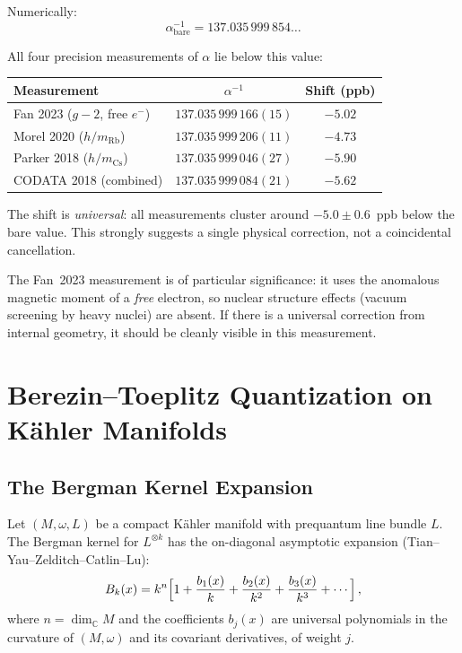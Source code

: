 \documentclass[12pt,a4paper]{article}
\theoremstyle{definition}
\theoremstyle{remark}
\newcommand{\inv}{^{-1}}
\begin{document}
Numerically:
\begin{equation}
\alpha\inv_{\mathrm{bare}} = 137.035\,999\,854\ldots
\end{equation}

\medskip

All four precision measurements of $\alpha$ lie below this value:

\begin{center}
\begin{tabular}{lcc}
\toprule
Measurement & $\alpha\inv$ & Shift (ppb) \\
\midrule
Fan 2023 ($g{-}2$, free $e^-$) & $137.035\,999\,166(15)$ & $-5.02$ \\
Morel 2020 ($h/m_{\mathrm{Rb}}$) & $137.035\,999\,206(11)$ & $-4.73$ \\
Parker 2018 ($h/m_{\mathrm{Cs}}$) & $137.035\,999\,046(27)$ & $-5.90$ \\
CODATA 2018 (combined) & $137.035\,999\,084(21)$ & $-5.62$ \\
\bottomrule
\end{tabular}
\end{center}

The shift is \emph{universal}: all measurements cluster around
$-5.0 \pm 0.6$~ppb below the bare value. This strongly suggests a single
physical correction, not a coincidental cancellation.

The Fan~2023 measurement is of particular significance: it uses the anomalous
magnetic moment of a \emph{free} electron, so nuclear structure effects
(vacuum screening by heavy nuclei) are absent. If there is a universal
correction from internal geometry, it should be cleanly visible in this
measurement.

\section{Berezin--Toeplitz Quantization on K\"ahler Manifolds}
\label{sec:BT}

\subsection{The Bergman Kernel Expansion}

Let $(M, \omega, L)$ be a compact K\"ahler manifold with prequantum line
bundle $L$. The Bergman kernel for $L^{\otimes k}$ has the on-diagonal
asymptotic expansion (Tian--Yau--Zelditch--Catlin--Lu):
\begin{equation}
\label{eq:TYZ}
B_k(x) = k^n\Bigl[1 + \frac{b_1(x)}{k} + \frac{b_2(x)}{k^2}
  + \frac{b_3(x)}{k^3} + \cdots\Bigr]\,,
\end{equation}
where $n = \dim_{\mathbb{C}} M$ and the coefficients $b_j(x)$ are universal
polynomials in the curvature of $(M, \omega)$ and its covariant derivatives,
of weight $j$.
\end{document}
